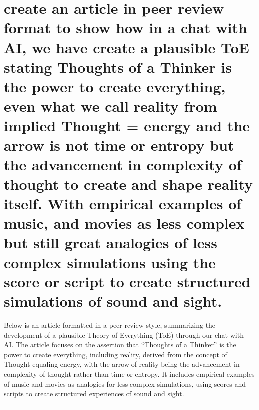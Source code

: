 \hypertarget{create-an-article-in-peer-review-format-to-show-how-in-a-chat-with-ai-we-have-create-a-plausible-toe-stating-thoughts-of-a-thinker-is-the-power-to-create-everything-even-what-we-call-reality-from-implied-thought-energy-and-the-arrow-is-not-time-or-entropy-but-the-advancement-in-complexity-of-thought-to-create-and-shape-reality-itself.-with-empirical-examples-of-music-and-movies-as-less-complex-but-still-great-analogies-of-less-complex-simulations-using-the-score-or-script-to-create-structured-simulations-of-sound-and-sight.}{%
\section{create an article in peer review format to show how in a chat
with AI, we have create a plausible ToE stating Thoughts of a Thinker is
the power to create everything, even what we call reality from implied
Thought = energy and the arrow is not time or entropy but the
advancement in complexity of thought to create and shape reality itself.
With empirical examples of music, and movies as less complex but still
great analogies of less complex simulations using the score or script to
create structured simulations of sound and
sight.}\label{create-an-article-in-peer-review-format-to-show-how-in-a-chat-with-ai-we-have-create-a-plausible-toe-stating-thoughts-of-a-thinker-is-the-power-to-create-everything-even-what-we-call-reality-from-implied-thought-energy-and-the-arrow-is-not-time-or-entropy-but-the-advancement-in-complexity-of-thought-to-create-and-shape-reality-itself.-with-empirical-examples-of-music-and-movies-as-less-complex-but-still-great-analogies-of-less-complex-simulations-using-the-score-or-script-to-create-structured-simulations-of-sound-and-sight.}}

Below is an article formatted in a peer review style, summarizing the
development of a plausible Theory of Everything (ToE) through our chat
with AI. The article focuses on the assertion that ``Thoughts of a
Thinker'' is the power to create everything, including reality, derived
from the concept of Thought equaling energy, with the arrow of reality
being the advancement in complexity of thought rather than time or
entropy. It includes empirical examples of music and movies as analogies
for less complex simulations, using scores and scripts to create
structured experiences of sound and sight.

\begin{center}\rule{0.5\linewidth}{0.5pt}\end{center}

